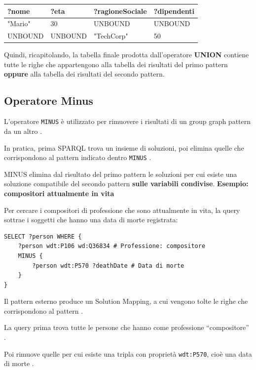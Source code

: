 \begin{table}[h!]
\centering
\begin{tabular}{|l|l|l|l|}
\hline
\textbf{?nome} & \textbf{?eta} & \textbf{?ragioneSociale} & \textbf{?dipendenti} \\ \hline
"Mario" & 30 & UNBOUND & UNBOUND  \\ \hline
UNBOUND & UNBOUND & "TechCorp" & 50 \\ \hline
\end{tabular}
\end{table}
\begin{center}
Quindi, ricapitolando, la tabella finale prodotta dall'operatore
\textbf{UNION} contiene tutte le righe che appartengono alla tabella
dei risultati del primo pattern \textbf{oppure} alla tabella dei risultati
del secondo pattern.
\end{center}



\subsection{Operatore Minus}
L'operatore \texttt{MINUS} è utilizzato per rimuovere i risultati di un group graph pattern da un altro .

In pratica, prima SPARQL trova un insieme di soluzioni, poi elimina quelle che corrispondono al pattern indicato dentro \texttt{MINUS} .


MINUS elimina dal risultato del primo pattern le soluzioni per cui esiste una soluzione compatibile del secondo pattern \textbf{sulle variabili condivise}.
\textbf{Esempio: compositori attualmente in vita} 

Per cercare i compositori di professione che sono attualmente in vita, la query sottrae i soggetti che hanno una data di morte registrata: 

\begin{verbatim}
SELECT ?person WHERE {
    ?person wdt:P106 wd:Q36834 # Professione: compositore
    MINUS {
        ?person wdt:P570 ?deathDate # Data di morte
    }
}
\end{verbatim} 

Il pattern esterno produce un Solution Mapping, a cui vengono tolte le righe che corrispondono al pattern .

La query prima trova tutte le persone che hanno come professione ``compositore'' .

Poi rimuove quelle per cui esiste una tripla con proprietà \texttt{wdt:P570}, cioè una data di morte .

